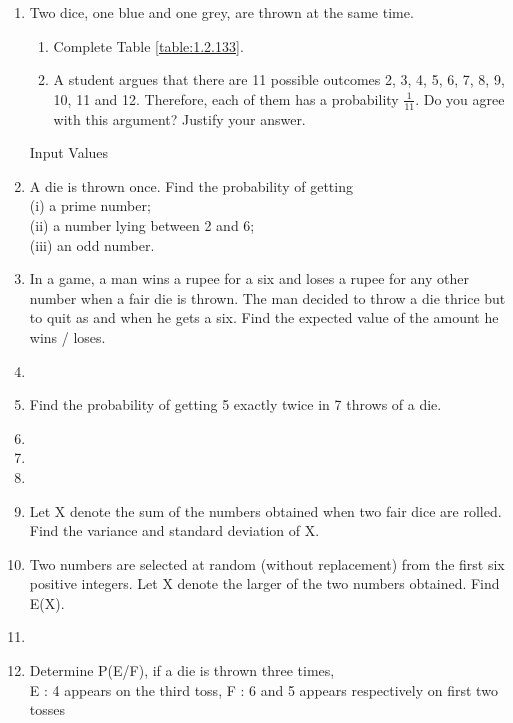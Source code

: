 \renewcommand{\theequation}{\theenumi}
\begin{enumerate}[label=\thesection.\arabic*.,ref=\thesection.\theenumi]


\item Two dice, one blue and one grey, are thrown at the same time.  
\begin{enumerate}
\item  Complete Table \ref{table:1.2.133}.
\item  A student argues that there are 11 possible outcomes 2, 3, 4, 5, 6, 7, 8, 9, 10, 11 and 12. Therefore, each of them has a probability $\frac{1}{11}$. Do you agree with this argument? Justify your answer.
\end{enumerate}
%
\begin{table}[ht!]
\centering

\caption{Input Values}
\label{table:1.2.133}	
\end{table}
\item A die is thrown once. Find the probability of getting\\
(i) a prime number;\\
(ii) a number lying between 2 and 6;\\
(iii) an odd number.
\\
\solution

\item In a game, a man wins a rupee for a six and loses a rupee for any other number when a fair die is thrown. The man decided to throw a die thrice but to quit as and when he gets a six. Find the expected value of the amount he wins / loses.\\
\item 
\item Find the probability of getting 5 exactly twice in 7 throws of a die.\\
\item 

\item
\item 
\item Let X denote the sum of the numbers obtained when two fair dice are rolled. Find the variance and standard deviation of X.\\
\item Two numbers are selected at random (without replacement) from the first six positive integers. Let X denote the larger of the two numbers obtained. Find E(X).\\
%
\solution

\item
\item Determine P(E/F), if a die is thrown three times,\\
E : 4 appears on the third toss, F : 6 and 5 appears respectively on first two tosses\\


\end{enumerate}
